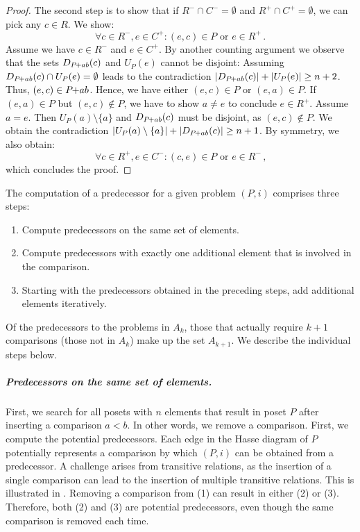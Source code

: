 \documentclass[a4paper,UKenglish,cleveref, autoref, thm-restate]{lipics-v2021}
\newcommand{\pchild}[3]{{#1}\kern-1pt{+}{#2}{#3}}
\newcommand{\less}[2]{D_{#1}(#2)}
\newcommand{\greater}[2]{U_{#1}(#2)}
\begin{document}
\begin{proof}
  The second step is to show that if $R^- \cap C^- = \emptyset$ and $R^+ \cap C^+ = \emptyset$, we can pick any $c \in R$.
  We show:
  \begin{equation}
    \forall c \in R^-, e \in C^+ \colon (e, c) \in P \text{ or } e \in R^+\,\text{.}
  \end{equation}
  Assume we have $c \in R^-$ and $e \in C^+$.
  By another counting argument we observe that the sets $\less{\pchild{P}{a}{b}}{c}$ and $\greater{P}{e}$ cannot be disjoint:
  Assuming $\less{\pchild{P}{a}{b}}{c} \cap \greater{P}{e} = \emptyset$ leads to the contradiction $|\less{\pchild{P}{a}{b}}{c}| + |\greater{P}{e}| \ge n + 2$.
  Thus, $(e, c) \in \pchild{P}{a}{b}$.
  Hence, we have either $(e, c) \in P$ or $(e, a) \in P$.
  If $(e, a) \in P$ but $(e, c) \notin P$, we have to show $a \neq e$ to conclude $e \in R^+$.
  Assume $a = e$.
  Then $\greater{P}{a} \setminus \{ a \}$ and $\less{\pchild{P}{a}{b}}{c}$ must be disjoint, as $(e, c) \notin P$.
  We obtain the contradiction $|\greater{P}{a} \setminus \{ a \}| + |\less{\pchild{P}{a}{b}}{c}| \ge n + 1$.
  By symmetry, we also obtain:
  \begin{equation}
    \forall c \in R^+, e \in C^- \colon (c, e) \in P \text{ or } e \in R^-\,\text{,}
  \end{equation}
  which concludes the proof.
\end{proof}

The computation of a predecessor for a given problem $(P, i)$ comprises three steps:
\begin{enumerate}
  \item Compute predecessors on the same set of elements.
  \item Compute predecessors with exactly one additional element that is involved in the comparison.
  \item Starting with the predecessors obtained in the preceding steps, add additional elements iteratively.
\end{enumerate}
Of the predecessors to the problems in $A_k$, those that actually require $k+1$ comparisons (those not in $A_k$) make up the set $A_{k+1}$.
We describe the individual steps below.

\subparagraph{Predecessors on the same set of elements.}
First, we search for all posets with $n$ elements that result in poset $P$ after inserting a comparison $a < b$.
In other words, we remove a comparison.
First, we compute the potential predecessors.
Each edge in the Hasse diagram of $P$ potentially represents a comparison by which $(P, i)$ can be obtained from a predecessor.
A challenge arises from transitive relations, as the insertion of a single comparison can lead to the insertion of multiple transitive relations.
This is illustrated in .
Removing a comparison from (1) can result in either (2) or (3).
Therefore, both (2) and (3) are potential predecessors, even though the same comparison is removed each time.
\end{document}
